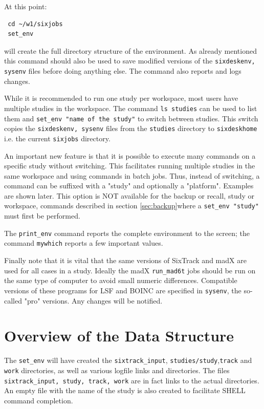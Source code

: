 \documentclass{cernatsnote}    %
\begin{document}
At this point:
\begin{verbatim}
 cd ~/w1/sixjobs
 set_env
\end{verbatim}
will create the full directory structure of the environment.
As already mentioned this command should also be used to save
modified versions of the {\tt sixdeskenv, sysenv} files before doing
anything else. The command also reports and logs changes. 

While it is recommended to run one study per workspace, most users have
multiple studies in the workspace. The command {\tt ls studies} can be used
to list them and {\tt set\_env "name of the study"} to switch between studies.
This switch copies the {\tt sixdeskenv, sysenv} files from the
{\tt studies} directory to {\tt sixdeskhome} i.e. the current {\tt sixjobs} directory. 

An important new feature is that it is possible to execute many commands
on a specific study without switching. This facilitates running multiple
studies in the same workspace and using commands in batch jobs.  
Thus, instead of switching, a command can be suffixed with a
"study" and optionally a "platform". Examples are shown later.
This option is NOT available for the backup or recall, study or workspace, 
commands described in section \ref{sec:backup}where a {\tt set\_env "study"}
must first be performed.

The {\tt print\_env} command reports the complete environment to the screen;
the command {\tt mywhich} reports a few important values.

Finally note that it is vital that the same versions of SixTrack and madX are used for
all cases in a study. Ideally the madX {\tt run\_mad6t} jobs should be run on the
same type of computer to avoid small numeric differences. Compatible versions of these
programs for LSF and BOINC are specified
in {\tt sysenv}, the so-called "pro" versions. Any changes will
be notified.

\section{Overview of the Data Structure}
The {\tt set\_env} will have created the {\tt sixtrack\_input},
{\tt studies/study},{\tt track} and {\tt work} directories, as well
as various logfile links and directories. 
The files {\tt sixtrack\_input, study, track, work} are in fact
links to the actual directories. An empty file with the name of the study
is also created to facilitate SHELL command completion.     
\end{document}
